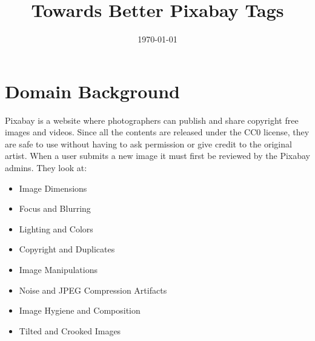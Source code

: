 \documentclass[10pt, a4paper, twocolumn]{article} %
\title{Towards Better Pixabay Tags} %
\author{
	\authorstyle{Willie Maddox} %
}
\date{\today} %
\begin{document}
\maketitle %

\thispagestyle{firstpage} %




\section{Domain Background} %


Pixabay is a website where photographers can publish and share copyright free images and videos.  Since all the contents are released under the CC0 license, they are safe to use without having to ask permission or give credit to the original artist. When a user submits a new image it must first be reviewed by the Pixabay admins.  They look at: 

\begin{itemize}
	\item Image Dimensions
	\item Focus and Blurring
	\item Lighting and Colors
	\item Copyright and Duplicates
	\item Image Manipulations
	\item Noise and JPEG Compression Artifacts
	\item Image Hygiene and Composition
	\item Tilted and Crooked Images
\end{itemize}
\end{document}
